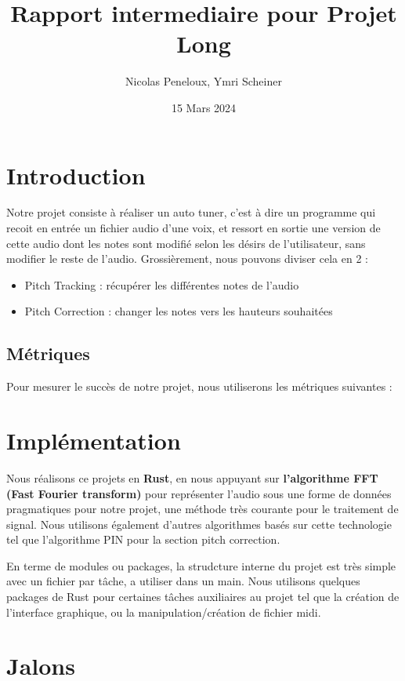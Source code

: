 \documentclass{article}
\title{Rapport intermediaire pour Projet Long}
\author{Nicolas Peneloux, Ymri Scheiner}
\date{15 Mars 2024}
\begin{document}
\maketitle

\section{Introduction}

Notre projet consiste à réaliser un auto tuner, c'est à dire un programme qui recoit en entrée un fichier audio d'une voix, et ressort en sortie une version de cette audio dont les notes sont modifié selon les désirs de l'utilisateur, sans modifier le reste de l'audio. Grossièrement, nous pouvons diviser cela en 2 : 
\begin{itemize}
  \item Pitch Tracking : récupérer les différentes notes de l'audio
  \item Pitch Correction : changer les notes vers les hauteurs souhaitées
\end{itemize}
\par 

\subsection*{Métriques}
Pour mesurer le succès de notre projet, nous utiliserons les métriques suivantes :




\section{Implémentation}

Nous réalisons ce projets en \textbf{Rust}, en nous appuyant sur \textbf{l'algorithme FFT (Fast Fourier transform)} pour représenter l'audio sous une forme de données pragmatiques pour notre projet, une méthode très courante pour le traitement de signal. 
Nous utilisons également d'autres algorithmes basés sur cette technologie tel que l'algorithme PIN pour la section pitch correction.
\par
En terme de modules ou packages, la strudcture interne du projet est très simple avec un fichier par tâche, a utiliser dans un main.
Nous utilisons quelques packages de Rust pour certaines tâches auxiliaires au projet tel que la création de l'interface graphique, ou la manipulation/création de fichier midi.


\section{Jalons}
\end{document}
